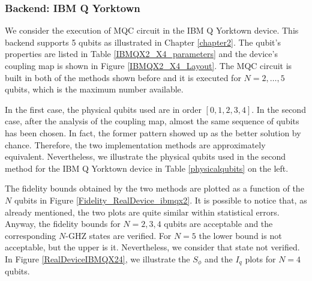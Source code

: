 \subsubsection{Backend: IBM Q Yorktown}

We consider the execution of MQC circuit in the IBM Q Yorktown device. This backend supports 5 qubits as illustrated in Chapter \ref{chapter2}. The qubit's properties are listed in Table \ref{IBMQX2_X4_parameters} and the device's coupling map is shown in Figure \ref{IBMQX2_X4_Layout}. 
The MQC circuit is built in both of the methods shown before and it is executed for $N=2,\dots,5$ qubits, which is the maximum number available.

 In the first case, the physical qubits used are in order $[0,1,2,3,4]$. In the second case, after the analysis of the coupling map, almost the same sequence of qubits has been chosen. In fact, the former pattern showed up as the better solution by chance. Therefore, the two implementation methods are approximately equivalent. Nevertheless, we illustrate the physical qubits used in the second method for the IBM Q Yorktown device in Table \ref{physicalqubits} on the left. 
 
The fidelity bounds obtained by the two methods are plotted as a function of the $N$ qubits in Figure \ref{Fidelity_RealDevice_ibmqx2}.
It is possible to notice that, as already mentioned, the two plots are quite similar within statistical errors. Anyway, the fidelity bounds for $N=2,3,4$ qubits are acceptable and the corresponding $N$-GHZ states are verified. For $N=5$ the lower bound is not acceptable, but the upper is it. Nevertheless, we consider that state not verified. In Figure \ref{RealDeviceIBMQX24}, we illustrate the $S_{\phi}$ and the $I_q$ plots for $N=4$ qubits. 


